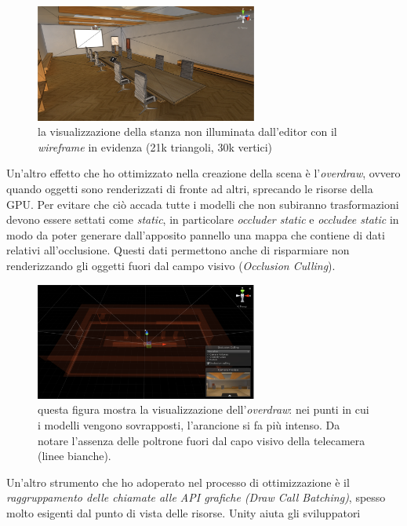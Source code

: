 \begin{figure}[H]
	\includegraphics[width=0.65\textwidth]{figure/RoomWire}
	\centering
	\vspace{0.3cm}
	\caption{la visualizzazione della stanza non illuminata dall'editor con il \textit{wireframe} in evidenza (21k triangoli, 30k vertici) }
\end{figure}
Un'altro effetto che ho ottimizzato nella creazione della scena è l'\textit{overdraw}, ovvero quando oggetti sono renderizzati di fronte ad altri, sprecando le risorse della GPU. Per evitare che ciò accada tutte i modelli che non subiranno trasformazioni devono essere settati come \textit{static}, in particolare \textit{occluder static} e \textit{occludee static} in modo da poter generare dall'apposito pannello una mappa che contiene di dati relativi all'occlusione. Questi dati permettono anche di risparmiare non renderizzando gli oggetti fuori dal campo visivo (\textit{Occlusion Culling}).
\begin{figure}[H]
	\includegraphics[width=0.65\textwidth]{figure/Overdraw}
	\centering
	\vspace{0.3cm}
	\caption{questa figura mostra la visualizzazione dell'\textit{overdraw}: nei punti in cui i modelli vengono sovrapposti, l'arancione si fa più intenso. Da notare l'assenza delle poltrone fuori dal capo visivo della telecamera (linee bianche).}
\end{figure}
Un'altro strumento che ho adoperato nel processo di ottimizzazione è il \textit{raggruppamento delle chiamate alle API grafiche (Draw Call Batching)}, spesso molto esigenti dal punto di vista delle risorse. Unity aiuta gli sviluppatori
